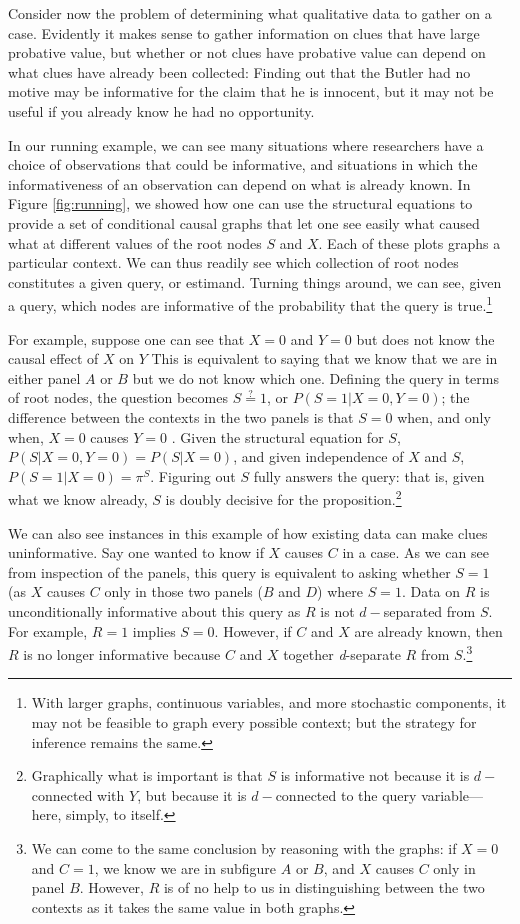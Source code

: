\documentclass[12pt,]{book}
\let\rmarkdownfootnote\footnote%
\def\footnote{\protect\rmarkdownfootnote}
\begin{document}
Consider now the problem of determining what qualitative data to gather on a case. Evidently it makes sense to gather information on clues that have large probative value, but whether or not clues have probative value can depend on what clues have already been collected: Finding out that the Butler had no motive may be informative for the claim that he is innocent, but it may not be useful if you already know he had no opportunity.

In our running example, we can see many situations where researchers have a choice of observations that could be informative, and situations in which the informativeness of an observation can depend on what is already known. In Figure \ref{fig:running}, we showed how one can use the structural equations to provide a set of conditional causal graphs that let one see easily what caused what at different values of the root nodes \(S\) and \(X\). Each of these plots graphs a particular context. We can thus readily see which collection of root nodes constitutes a given query, or estimand. Turning things around, we can see, given a query, which nodes are informative of the probability that the query is true.\footnote{With larger graphs, continuous variables, and more stochastic components, it may not be feasible to graph every possible context; but the strategy for inference remains the same.}

For example, suppose one can see that \(X=0\) and \(Y=0\) but does not know the causal effect of \(X\) on \(Y\) This is equivalent to saying that we know that we are in either panel \(A\) or \(B\) but we do not know which one. Defining the query in terms of root nodes, the question becomes \(S \stackrel{?}{=} 1\), or \(P(S=1|X=0,Y=0)\); the difference between the contexts in the two panels is that \(S=0\) when, and only when, \(X=0\) causes \(Y=0\) . Given the structural equation for \(S\), \(P(S|X=0,Y=0) = P(S|X=0)\), and given independence of \(X\) and \(S\), \(P(S=1|X=0)= \pi^S\). Figuring out \(S\) fully answers the query: that is, given what we know already, \(S\) is doubly decisive for the proposition.\footnote{Graphically what is important is that \(S\) is informative not because it is \(d-\)connected with \(Y\), but because it is \(d-\)connected to the query variable---here, simply, to itself.}

We can also see instances in this example of how existing data can make clues uninformative. Say one wanted to know if \(X\) causes \(C\) in a case. As we can see from inspection of the panels, this query is equivalent to asking whether \(S=1\) (as \(X\) causes \(C\) only in those two panels (\(B\) and \(D\)) where \(S=1\). Data on \(R\) is unconditionally informative about this query as \(R\) is not \(d-\)separated from \(S\). For example, \(R=1\) implies \(S=0\). However, if \(C\) and \(X\) are already known, then \(R\) is no longer informative because \(C\) and \(X\) together \emph{d}-separate \(R\) from \(S\).\footnote{We can come to the same conclusion by reasoning with the graphs: if \(X=0\) and \(C=1\), we know we are in subfigure \(A\) or \(B\), and \(X\) causes \(C\) only in panel \(B\). However, \(R\) is of no help to us in distinguishing between the two contexts as it takes the same value in both graphs.}
\end{document}
